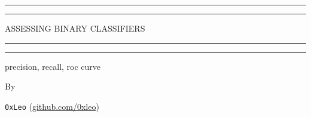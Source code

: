\begin{titlepage} %

	\centering %
	
	\scshape %
	
	\vspace*{\baselineskip} %
	
	
	\rule{\textwidth}{1.6pt}\vspace*{-\baselineskip}\vspace*{2pt} %
	\rule{\textwidth}{0.4pt} %
	
	\vspace{0.75\baselineskip} %
	
	{\LARGE ASSESSING BINARY CLASSIFIERS\\} %
	
	\vspace{0.75\baselineskip} %
	
	\rule{\textwidth}{0.4pt}\vspace*{-\baselineskip}\vspace{3.2pt} %
	\rule{\textwidth}{1.6pt} %
	
	\vspace{2\baselineskip} %
	
	
	\vspace*{3\baselineskip} %
	
	precision, recall, roc curve
	
	\vspace*{3\baselineskip} %
	
	
	By
	
	\vspace{0.5\baselineskip} %
	
	{\normalfont \Large \texttt{0xLeo} (\url{github.com/0xleo}) \\} %
	

\end{titlepage}
